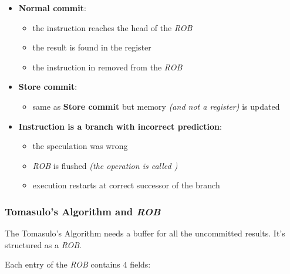 \documentclass[english]{article}
\begin{document}
\begin{itemize}
  \item \textbf{Normal commit}:
        \begin{itemize}
          \item the instruction reaches the head of the \textit{ROB}
          \item the result is found in the register
          \item the instruction in removed from the \textit{ROB}
        \end{itemize}
  \item \textbf{Store commit}:
        \begin{itemize}
          \item same as \textbf{Store commit} but memory \textit{(and not a register)} is updated
        \end{itemize}
  \item \textbf{Instruction is a branch with incorrect prediction}:
        \begin{itemize}
          \item the speculation was wrong
          \item \textit{ROB} is flushed \textit{(the operation is called )}
          \item execution restarts at correct successor of the branch
        \end{itemize}
\end{itemize}

\subsubsection{Tomasulo's Algorithm and \textit{ROB}}

The Tomasulo's Algorithm needs a buffer for all the uncommitted results.
It's structured as a \textit{ROB}.

Each entry of the \textit{ROB} contains \(4\) fields:
\end{document}
